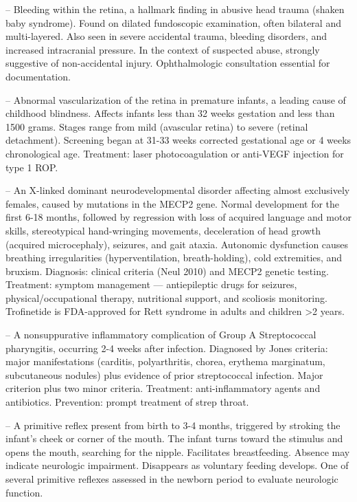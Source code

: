 -- Bleeding within the retina, a hallmark finding in abusive head trauma (shaken baby syndrome). Found on dilated fundoscopic examination, often bilateral and multi-layered. Also seen in severe accidental trauma, bleeding disorders, and increased intracranial pressure. In the context of suspected abuse, strongly suggestive of non-accidental injury. Ophthalmologic consultation essential for documentation.

-- Abnormal vascularization of the retina in premature infants, a leading cause of childhood blindness. Affects infants less than 32 weeks gestation and less than 1500 grams. Stages range from mild (avascular retina) to severe (retinal detachment). Screening began at 31-33 weeks corrected gestational age or 4 weeks chronological age. Treatment: laser photocoagulation or anti-VEGF injection for type 1 ROP.

-- An X-linked dominant neurodevelopmental disorder affecting almost exclusively females, caused by mutations in the MECP2 gene. Normal development for the first 6-18 months, followed by regression with loss of acquired language and motor skills, stereotypical hand-wringing movements, deceleration of head growth (acquired microcephaly), seizures, and gait ataxia. Autonomic dysfunction causes breathing irregularities (hyperventilation, breath-holding), cold extremities, and bruxism. Diagnosis: clinical criteria (Neul 2010) and MECP2 genetic testing. Treatment: symptom management — antiepileptic drugs for seizures, physical/occupational therapy, nutritional support, and scoliosis monitoring. Trofinetide is FDA-approved for Rett syndrome in adults and children >2 years.

-- A nonsuppurative inflammatory complication of Group A Streptococcal pharyngitis, occurring 2-4 weeks after infection. Diagnosed by Jones criteria: major manifestations (carditis, polyarthritis, chorea, erythema marginatum, subcutaneous nodules) plus evidence of prior streptococcal infection. Major criterion plus two minor criteria. Treatment: anti-inflammatory agents and antibiotics. Prevention: prompt treatment of strep throat.

-- A primitive reflex present from birth to 3-4 months, triggered by stroking the infant's cheek or corner of the mouth. The infant turns toward the stimulus and opens the mouth, searching for the nipple. Facilitates breastfeeding. Absence may indicate neurologic impairment. Disappears as voluntary feeding develops. One of several primitive reflexes assessed in the newborn period to evaluate neurologic function.

